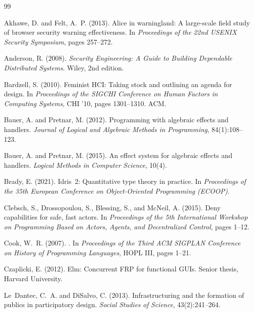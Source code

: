 \documentclass[11pt,a4paper]{article}
\begin{document}
\begin{thebibliography}{99}

Akhawe, D. and Felt, A.~P. (2013).
\newblock Alice in warningland: A large-scale field study of browser security
  warning effectiveness.
\newblock In \emph{Proceedings of the 22nd USENIX Security Symposium}, pages
  257--272.

Anderson, R. (2008).
\newblock \emph{Security Engineering: A Guide to Building Dependable
  Distributed Systems}.
\newblock Wiley, 2nd edition.

Bardzell, S. (2010).
\newblock Feminist {HCI}: Taking stock and outlining an agenda for design.
\newblock In \emph{Proceedings of the SIGCHI Conference on Human Factors in
  Computing Systems}, CHI '10, pages 1301--1310. ACM.

Bauer, A. and Pretnar, M. (2012).
\newblock Programming with algebraic effects and handlers.
\newblock \emph{Journal of Logical and Algebraic Methods in Programming},
  84(1):108--123.

Bauer, A. and Pretnar, M. (2015).
\newblock An effect system for algebraic effects and handlers.
\newblock \emph{Logical Methods in Computer Science}, 10(4).

Brady, E. (2021).
\newblock Idris~2: Quantitative type theory in practice.
\newblock In \emph{Proceedings of the 35th European Conference on
  Object-Oriented Programming (ECOOP)}.

Clebsch, S., Drossopoulou, S., Blessing, S., and McNeil, A. (2015).
\newblock Deny capabilities for safe, fast actors.
\newblock In \emph{Proceedings of the 5th International Workshop on Programming
  Based on Actors, Agents, and Decentralized Control}, pages 1--12.

Cook, W.~R. (2007).
.
\newblock In \emph{Proceedings of the Third ACM SIGPLAN Conference on History
  of Programming Languages}, HOPL III, pages 1--21.

Czaplicki, E. (2012).
\newblock Elm: Concurrent {FRP} for functional {GUIs}.
\newblock Senior thesis, Harvard University.

{Le~Dantec}, C.~A. and DiSalvo, C. (2013).
\newblock Infrastructuring and the formation of publics in participatory
  design.
\newblock \emph{Social Studies of Science}, 43(2):241--264.


\end{thebibliography}
\end{document}
